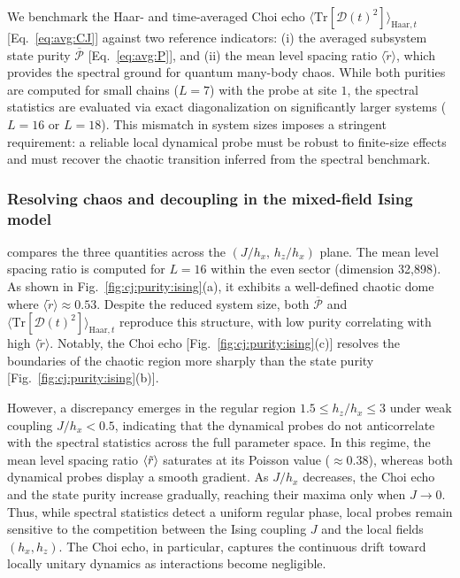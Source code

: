 \documentclass[pra,twocolumn,aps,showpacs,superscriptaddress,longbibliography]{revtex4-2}
\newcommand{\choip}{\langle \text{Tr}[\mathcal{D}(t)^2] \rangle_{\mathrm{Haar}, t}}
\newcommand{\statep}{\overline{\mathcal{P}}}
\newcommand{\mlsr}{\ev{\tilde{r}}}
\begin{document}
We benchmark the Haar- and time-averaged Choi echo $\choip$ [Eq.~\eqref{eq:avg:CJ}] against two reference indicators:  
(i) the averaged subsystem state purity $\statep$ [Eq.~\eqref{eq:avg:P}], and  
(ii) the mean level spacing ratio $\langle \tilde{r} \rangle$, which provides the spectral ground for quantum many-body chaos. While both purities are computed for small chains ($L=7$) with the probe at site $1$, the spectral statistics are evaluated via exact diagonalization on significantly larger systems ($L=16$ or $L=18$). This mismatch in system sizes imposes a stringent requirement: a reliable local dynamical probe must be robust to finite-size effects and must recover the chaotic transition inferred from the spectral benchmark.

\subsubsection{Resolving chaos and decoupling in the mixed-field Ising model}
 compares the three quantities across the $(J/h_x,\,h_z/h_x)$ plane. The mean level spacing ratio is computed for $L=16$ within the even sector (dimension 32,898). As shown in Fig.~\ref{fig:cj:purity:ising}(a), it exhibits a well-defined chaotic dome where $\langle \tilde{r} \rangle \approx 0.53$. Despite the reduced system size, both $\statep$ and $\choip$ reproduce this structure, with low purity correlating with high $\langle \tilde{r} \rangle$. Notably, the Choi echo [Fig.~\ref{fig:cj:purity:ising}(c)] resolves the boundaries of the chaotic region more sharply than the state purity [Fig.~\ref{fig:cj:purity:ising}(b)].

However, a discrepancy emerges in the regular region $1.5 \le h_z/h_x \le 3$ under weak coupling $J/h_x < 0.5$, indicating that the dynamical probes do not anticorrelate with the spectral statistics across the full parameter space. In this regime, the mean level spacing ratio $\mlsr$ saturates at its Poisson value ($\approx 0.38$), whereas both dynamical probes display a smooth gradient. As $J/h_x$ decreases, the Choi echo and the state purity increase gradually, reaching their maxima only when $J \to 0$. Thus, while spectral statistics detect a uniform regular phase, local probes remain sensitive to the competition between the Ising coupling $J$ and the local fields $(h_x, h_z)$. The Choi echo, in particular, captures the continuous drift toward locally unitary dynamics as interactions become negligible.
\end{document}
